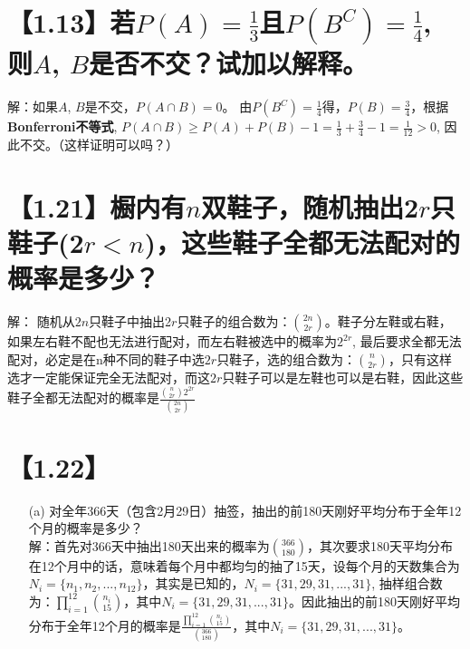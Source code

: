 \documentclass [12pt]{article}
\begin{document}
\begin{CJK*}{GBK}{kai}
\section{【1.13】若$P(A)=\frac{1}{3}$且$P(B^{C})=\frac{1}{4}$, 则$A$, $B$是否不交？试加以解释。}
解：如果$A$, $B$是不交，$P(A \cap B) =0$。 由$P(B^{C})=\frac{1}{4}$得，$P(B)=\frac{3}{4}$，根据\textbf{Bonferroni不等式}, $P(A \cap B) \geqslant P(A)+P(B) - 1 =  \frac{1}{3}  +  \frac{3}{4}  - 1 = \frac{1}{12} > 0$, 因此不交。（这样证明可以吗？）
 
\section{【1.21】橱内有$n$双鞋子，随机抽出2$r$只鞋子(2$r<n$)，这些鞋子全都无法配对的概率是多少？}
解： 随机从$2n$只鞋子中抽出2$r$只鞋子的组合数为：${2n \choose 2r}$。鞋子分左鞋或右鞋，如果左右鞋不配也无法进行配对，而左右鞋被选中的概率为$2^{2r}$, 最后要求全都无法配对，必定是在n种不同的鞋子中选$2r$只鞋子，选的组合数为：${n \choose 2r}$，只有这样选才一定能保证完全无法配对，而这$2r$只鞋子可以是左鞋也可以是右鞋，因此这些鞋子全都无法配对的概率是$\frac{{n \choose 2r} 2^{2r}}{{2n \choose 2r}}$
\section{【1.22】}
\begin{enumerate}
  \item[(a)]  对全年366天（包含2月29日）抽签，抽出的前180天刚好平均分布于全年12个月的概率是多少？\\
  解：首先对366天中抽出180天出来的概率为${366 \choose 180}$，其次要求180天平均分布在12个月中的话，意味着每个月中都均匀的抽了15天，设每个月的天数集合为$N_i=\{n_1,n_2,...,n_{12}\}$，其实是已知的，$N_i=\{31,29,31,...,31\}$, 抽样组合数为：$\prod\limits_{i=1}^{12}{n_i \choose 15}$，其中$N_i=\{31,29,31,...,31\}$。因此抽出的前180天刚好平均分布于全年12个月的概率是$\frac{\prod\limits_{i=1}^{12}{n_i \choose 15}}{{366 \choose 180}}$，其中$N_i=\{31,29,31,...,31\}$。
  

\end{enumerate}
\end{CJK*}
\end{document}
